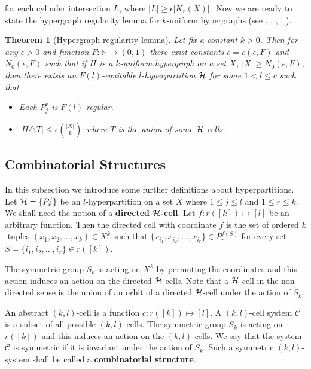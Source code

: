 \documentclass [11pt] {article}
\newtheorem{theorem}{Theorem}
\def\e{\epsilon}
\def\bN{{\mathbb N}}\def\bQ{{\mathbb Q}}
\def\cH{\mbox{$\cal H$}}
\def\to{\rightarrow}
\begin{document}
for each cylinder intersection $L$, where $|L|\geq \e |K_r(X)|\,.$
Now we are ready to state the hypergraph regularity lemma for $k$-uniform
hypergraphs (see \cite{Gow}, \cite{Ish}, \cite{RS}, \cite {RSko}, \cite{Tao}).
\begin{theorem}[Hypergraph regularity lemma]
\label{regularitylemma} Let fix a constant $k>0$. Then
for any $\e>0$ and function $F:\bN\to(0,1)$ there exist
constants $c=c(\e,F)$ and $N_0(\e, F)$ such that if $H$ is
a $k$-uniform hypergraph on a set $X$, $|X|\geq N_0(\e,F)$, then there
exists an $F(l)$-equitable $l$-hyperpartition $\cH$ for some
$1<l\leq c$ such that
\begin{itemize}
\item  Each $P^r_j$ is $F(l)$-regular.
\item $|H\triangle T|\leq \e {{|X|}\choose{k}}\,$
where $T$ is the union of some $\cH$-cells.
\end{itemize}
\end{theorem}
\subsection{Combinatorial Structures} \label{combstruct}

In this subsection
 we introduce some further 
definitions about hyperpartitions. 
 Let $\cH=\{P^j_r\}$ be an $l$-hyperpartition 
on a set $X$ where $1\leq j\leq l$ and $1\leq r\leq k$. 
We shall need the notion of a {\bf directed $\cH$-cell}. 
Let $f:r([k])\mapsto [l]$ be an arbitrary function. 
Then the directed cell with coordinate $f$ is the set of ordered 
$k$-tuples $(x_1,x_2,\dots,x_k)\in X^k$ 
such that $\{x_{i_1},x_{i_2},\dots,x_{i_r}\}\in P^{f(S)}_r$ 
for every set $S=\{i_1,i_2,\dots,i_r\}\in r([k])$.

The symmetric group $S_k$ is acting on $X^k$ by permuting the coordinates and
this action induces an action on the directed $\cH$-cells. 
Note that a $\cH$-cell in the non-directed sense is the union of 
an orbit of a directed $\cH$-cell under the action of $S_k$.

An abstract $(k,l)$-cell is a function $c:r([k])\mapsto [l]$. 
A $(k,l)$-cell system $\mathcal{C}$ is a subset of all possible
$(k,l)$-cells. The symmetric group $S_k$ is acting on $r([k])$ and this
induces 
an action on the $(k,l)$-cells. We say that the system $\mathcal{C}$ is 
symmetric if it is invariant under the action of $S_k$. Such a symmetric
$(k,l)$-system shall be called a {\bf combinatorial structure}.
\end{document}
